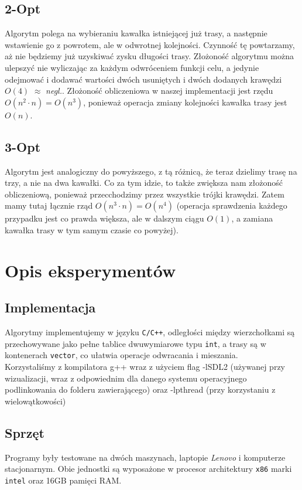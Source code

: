 \documentclass{article}
\begin{document}
\subsection{2-Opt}
Algorytm polega na wybieraniu kawałka istniejącej już trasy, a następnie wstawienie go z powrotem, ale w odwrotnej kolejności. Czynność tę powtarzamy, aż nie będziemy już uzyskiwać zysku długości trasy. Złożoność algorytmu można ulepszyć nie wyliczając za każdym odwróceniem funkcji celu, a jedynie odejmować i dodawać wartości dwóch usuniętych i dwóch dodanych krawędzi $O(4)$ $\approx$ \textit{negl.}. Złożoność obliczeniowa w naszej implementacji jest rzędu $O(n^2\cdot n) = O(n^3)$, ponieważ operacja zmiany kolejności kawałka trasy jest $O(n)$.

\subsection{3-Opt}
Algorytm jest analogiczny do powyższego, z tą różnicą, że teraz dzielimy trasę na trzy, a nie na dwa kawałki. Co za tym idzie, to także zwiększa nam złożoność obliczeniową, ponieważ przecchodzimy przez wszystkie trójki krawędzi. Zatem mamy tutaj łącznie rząd $O(n^3\cdot n) = O(n^4)$ (operacja sprawdzenia każdego przypadku jest co prawda większa, ale w dalszym ciągu $O(1)$, a zamiana kawałka trasy w tym samym czasie co powyżej).

\section{Opis eksperymentów}
\subsection{Implementacja}
Algorytmy implementujemy w języku \texttt{C/C++}, odległości między wierzchołkami są przechowywane jako pełne tablice dwuwymiarowe typu \texttt{int}, a trasy są w kontenerach \texttt{vector}, co ułatwia operacje odwracania i mieszania.\\
Korzystaliśmy z kompilatora g++ wraz z użyciem flag -lSDL2 (używanej przy wizualizacji, wraz z odpowiednim dla danego systemu operacyjnego podlinkowania do folderu zawierającego) oraz -lpthread (przy korzystaniu z wielowątkowości)

\subsection{Sprzęt}
Programy były testowane na dwóch maszynach, laptopie \textit{Lenovo} i komputerze stacjonarnym. Obie jednostki są wyposażone w procesor architektury \texttt{x86} marki \texttt{intel} oraz 16GB pamięci RAM.
\end{document}
